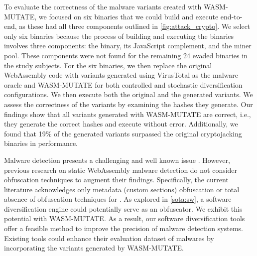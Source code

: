 \vspace{5mm}
\begin{strategy}
    \label{evasion_impact}
    To evaluate the correctness of the malware variants created with WASM-MUTATE, we focused on six binaries that we could build and execute end-to-end, as these had all three components outlined in \autoref{fig:attack_crypto}. 
    We select only six binaries because the process of building and executing the binaries involves three components: the \Wasm binary, its JavaScript complement, and the miner pool. 
    These components were not found for the remaining 24 evaded binaries in the study subjects.
    For the six binaries, we then replace the original WebAssembly code with variants generated using VirusTotal as the malware oracle and WASM-MUTATE for both controlled and stochastic diversification configurations. 
    We then execute both the original and the generated variants. 
    We assess the correctness of the variants by examining the hashes they generate.
    Our findings show that all variants generated with WASM-MUTATE are correct, i.e., they generate the correct hashes and execute without error.
    Additionally, we found that 19\% of the generated variants surpassed the original cryptojacking binaries in performance.
\end{strategy}



\begin{tcolorbox}[title=Reflection,boxrule=1pt,arc=.2em,boxsep=1.0mm]  
    Malware detection presents a challenging and well known issue \cite{cohen1987computer}. 
    However, previous research on static WebAssembly malware detection do not consider obfuscation techniques to augment their findings. 
    Specifically, the current literature acknowledges only metadata (\Wasm custom sections) obfuscation or total absence of obfuscation techniques for \Wasm \cite{Minesweeper, MinerRay, SEISMIC, RAPID, MINOS}. 
    As explored in \autoref{sota:sw}, a software diversification engine could potentially serve as an obfuscator. 
    We exhibit this potential with WASM-MUTATE. 
    As a result, our software diversification tools offer a feasible method to improve the precision of \Wasm malware detection systems. 
    Existing tools could enhance their evaluation dataset of \Wasm malwares by incorporating the variants generated by WASM-MUTATE.


\end{tcolorbox}


